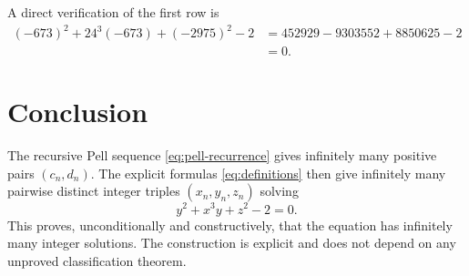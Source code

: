 \documentclass[11pt]{article}
\numberwithin{equation}{section}
\theoremstyle{remark}
\begin{document}
A direct verification of the first row is
\begin{align*}
    (-673)^2+24^3(-673)+(-2975)^2-2
    &=452929-9303552+8850625-2\\
    &=0.
\end{align*}

\section{Conclusion}

The recursive Pell sequence \eqref{eq:pell-recurrence} gives infinitely many positive pairs \((c_n,d_n)\).  The explicit formulas \eqref{eq:definitions} then give infinitely many pairwise distinct integer triples \((x_n,y_n,z_n)\) solving
\[
    y^2+x^3y+z^2-2=0.
\]
This proves, unconditionally and constructively, that the equation has infinitely many integer solutions.  The construction is explicit and does not depend on any unproved classification theorem.
\end{document}
